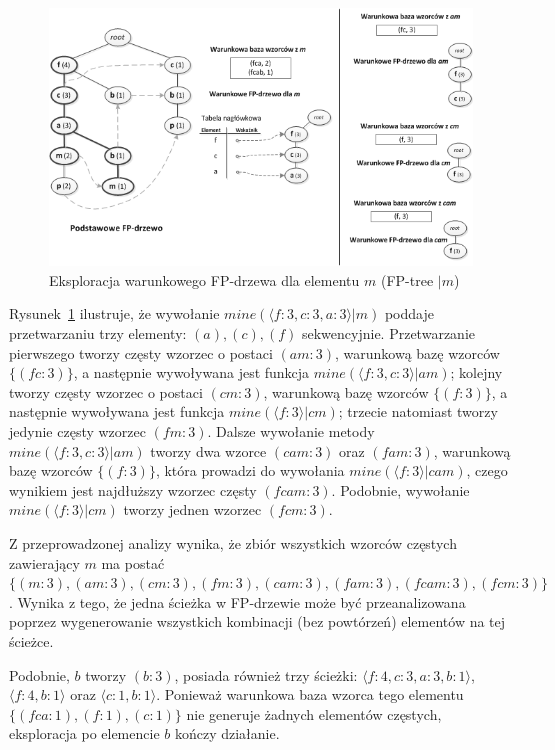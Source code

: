 \begin{figure}[h]
\centering\includegraphics{figures/02/mining_fptree.png}
\caption{Eksploracja warunkowego FP-drzewa dla elementu $m$ (FP-tree $| m$)~\cite{Main:FPgrowth}}\label{rys:mining_fptree}
\end{figure}

Rysunek~\ref{rys:mining_fptree} ilustruje, że wywołanie $mine(\langle f: 3, c: 3, a: 3 \rangle | m)$ poddaje przetwarzaniu trzy elementy: $(a), (c), (f)$ sekwencyjnie. Przetwarzanie pierwszego tworzy częsty wzorzec o postaci $(am: 3)$, warunkową bazę wzorców $\lbrace (fc: 3) \rbrace$, a następnie wywoływana jest funkcja $mine(\langle f: 3, c: 3 \rangle | am)$; kolejny tworzy częsty wzorzec o postaci $(cm: 3)$, warunkową bazę wzorców $\lbrace (f: 3)\rbrace$, a następnie wywoływana jest funkcja $mine(\langle f: 3 \rangle | cm)$; trzecie natomiast tworzy jedynie częsty wzorzec $(fm: 3)$. Dalsze wywołanie metody $mine(\langle f: 3, c: 3 \rangle | am)$ tworzy dwa wzorce $(cam: 3)$ oraz $(fam: 3)$, warunkową bazę wzorców $\lbrace ( f: 3 ) \rbrace$, która prowadzi do wywołania $mine(\langle f: 3 \rangle | cam)$, czego wynikiem jest najdłuższy wzorzec częsty $(fcam: 3)$. Podobnie, wywołanie $mine(\langle f: 3 \rangle | cm)$ tworzy jednen wzorzec $(fcm: 3)$. 

Z przeprowadzonej analizy wynika, że zbiór wszystkich wzorców częstych zawierający $m$ ma postać $\lbrace (m: 3), (am: 3), (cm: 3), (fm: 3), (cam: 3), (fam: 3), (fcam: 3), (fcm: 3) \rbrace$. Wynika z tego, że jedna ścieżka w FP-drzewie może być przeanalizowana poprzez wygenerowanie wszystkich kombinacji (bez powtórzeń) elementów na tej ścieżce.

Podobnie, $b$ tworzy $(b: 3)$, posiada również trzy ścieżki: $\langle f:4, c:3, a:3, b:1 \rangle$, $\langle f:4, b:1 \rangle$ oraz $\langle c:1, b:1 \rangle$. Ponieważ warunkowa baza wzorca tego elementu $\lbrace (fca:1), (f:1), (c:1)\rbrace$ nie generuje żadnych elementów częstych, eksploracja po elemencie $b$ kończy działanie. 

